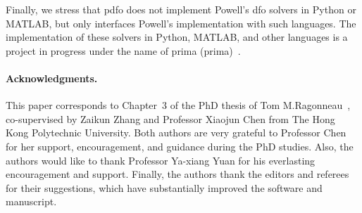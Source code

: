 \documentclass{article}
\numberwithin{equation}{section}
\theoremstyle{definition}
\theoremstyle{plain}
\theoremstyle{remark}
\begin{document}
Finally, we stress that \gls{pdfo} does not implement Powell's \gls{dfo} solvers in Python or MATLAB, but only interfaces Powell's implementation with such languages.
The implementation of these solvers in Python, MATLAB, and other languages is a project in progress under the name of \gls{prima} (\glsdesc{prima})~\cite{Zhang_prima}.

\paragraph{Acknowledgments.}

This paper corresponds to Chapter~3 of the PhD thesis of Tom M.\break Ragonneau~\cite{Ragonneau_2022}, co-supervised by Zaikun Zhang and Professor Xiaojun Chen from The Hong Kong Polytechnic University.
Both authors are very grateful to Professor Chen for her support, encouragement, and guidance during the PhD studies.
Also, the authors would like to thank Professor Ya-xiang Yuan for his everlasting encouragement and support.
Finally, the authors thank the editors and referees for their suggestions, which have substantially improved the software and manuscript.

\printbibliography
\end{document}
